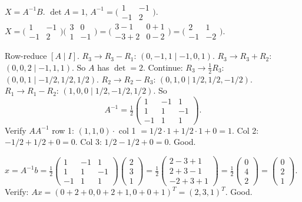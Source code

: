 \begin{solutions}
    \item $X = A^{-1} B$. $\det A = 1$, $A^{-1} = \bigl(\begin{smallmatrix} 1 & -1 \\ -1 & 2 \end{smallmatrix}\bigr)$. $X = \bigl(\begin{smallmatrix} 1 & -1 \\ -1 & 2 \end{smallmatrix}\bigr)\bigl(\begin{smallmatrix} 3 & 0 \\ 1 & -1 \end{smallmatrix}\bigr) = \bigl(\begin{smallmatrix} 3 - 1 & 0 + 1 \\ -3 + 2 & 0 - 2 \end{smallmatrix}\bigr) = \bigl(\begin{smallmatrix} 2 & 1 \\ -1 & -2 \end{smallmatrix}\bigr)$.
    \item Row-reduce $[A \mid I]$. $R_{3} \to R_{3} - R_{1}$: $(0, -1, 1 \mid -1, 0, 1)$. $R_{3} \to R_{3} + R_{2}$: $(0, 0, 2 \mid -1, 1, 1)$. So $A$ has $\det = 2$. Continue: $R_{3} \to \tfrac{1}{2}R_{3}$: $(0, 0, 1 \mid -1/2, 1/2, 1/2)$. $R_{2} \to R_{2} - R_{3}$: $(0, 1, 0 \mid 1/2, 1/2, -1/2)$. $R_{1} \to R_{1} - R_{2}$: $(1, 0, 0 \mid 1/2, -1/2, 1/2)$. So
    \[
    A^{-1} = \tfrac{1}{2}\begin{pmatrix} 1 & -1 & 1 \\ 1 & 1 & -1 \\ -1 & 1 & 1 \end{pmatrix}.
    \]
    Verify $A A^{-1}$ row 1: $(1, 1, 0) \cdot $ col 1 $= 1/2 \cdot 1 + 1/2 \cdot 1 + 0 = 1$. Col 2: $-1/2 + 1/2 + 0 = 0$. Col 3: $1/2 - 1/2 + 0 = 0$. Good.
    \item $x = A^{-1} b = \tfrac{1}{2}\begin{pmatrix} 1 & -1 & 1 \\ 1 & 1 & -1 \\ -1 & 1 & 1 \end{pmatrix}\begin{pmatrix} 2 \\ 3 \\ 1 \end{pmatrix} = \tfrac{1}{2}\begin{pmatrix} 2 - 3 + 1 \\ 2 + 3 - 1 \\ -2 + 3 + 1 \end{pmatrix} = \tfrac{1}{2}\begin{pmatrix} 0 \\ 4 \\ 2 \end{pmatrix} = \begin{pmatrix} 0 \\ 2 \\ 1 \end{pmatrix}$. Verify: $A x = (0 + 2 + 0, 0 + 2 + 1, 0 + 0 + 1)^{T} = (2, 3, 1)^{T}$. Good.

\end{solutions}
